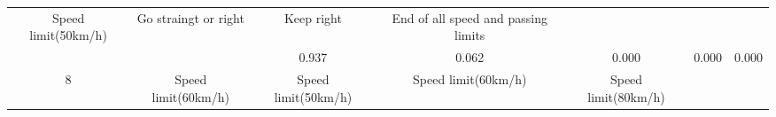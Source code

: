 \documentclass[11pt]{article}
\begin{document}
\begin{longtable}[]{@{}ccccccc@{}}
\begin{minipage}[t]{0.04\columnwidth}
Speed limit(50km/h)\strut
\end{minipage} & \begin{minipage}[t]{0.04\columnwidth}\centering\strut
Go straingt or right\strut
\end{minipage} & \begin{minipage}[t]{0.04\columnwidth}\centering\strut
Keep right\strut
\end{minipage} & \begin{minipage}[t]{0.04\columnwidth}\centering\strut
End of all speed and passing limits\strut
\end{minipage}\tabularnewline
\begin{minipage}[t]{0.04\columnwidth}\centering\strut
\strut
\end{minipage} & \begin{minipage}[t]{0.04\columnwidth}\centering\strut
\strut
\end{minipage} & \begin{minipage}[t]{0.04\columnwidth}\centering\strut
0.937\strut
\end{minipage} & \begin{minipage}[t]{0.04\columnwidth}\centering\strut
0.062\strut
\end{minipage} & \begin{minipage}[t]{0.04\columnwidth}\centering\strut
0.000\strut
\end{minipage} & \begin{minipage}[t]{0.04\columnwidth}\centering\strut
0.000\strut
\end{minipage} & \begin{minipage}[t]{0.04\columnwidth}\centering\strut
0.000\strut
\end{minipage}\tabularnewline
\begin{minipage}[t]{0.04\columnwidth}\centering\strut
8\strut
\end{minipage} & \begin{minipage}[t]{0.04\columnwidth}\centering\strut
Speed limit(60km/h)\strut
\end{minipage} & \begin{minipage}[t]{0.04\columnwidth}\centering\strut
Speed limit(50km/h)\strut
\end{minipage} & \begin{minipage}[t]{0.04\columnwidth}\centering\strut
Speed limit(60km/h)\strut
\end{minipage} & \begin{minipage}[t]{0.04\columnwidth}\centering\strut
Speed limit(80km/h)\strut
\end{minipage} & \begin{minipage}[t]{0.04\columnwidth}\centering\strut

\end{minipage}
\end{longtable}
\end{document}
